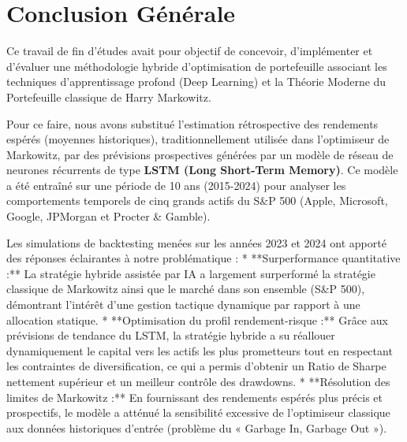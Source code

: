 \chapter*{Conclusion Générale}

Ce travail de fin d'études avait pour objectif de concevoir, d'implémenter et d'évaluer une méthodologie hybride d'optimisation de portefeuille associant les techniques d'apprentissage profond (Deep Learning) et la Théorie Moderne du Portefeuille classique de Harry Markowitz. 

Pour ce faire, nous avons substitué l'estimation rétrospective des rendements espérés (moyennes historiques), traditionnellement utilisée dans l'optimiseur de Markowitz, par des prévisions prospectives générées par un modèle de réseau de neurones récurrents de type \textbf{LSTM (Long Short-Term Memory)}. Ce modèle a été entraîné sur une période de 10 ans (2015-2024) pour analyser les comportements temporels de cinq grands actifs du S\&P 500 (Apple, Microsoft, Google, JPMorgan et Procter \& Gamble).

Les simulations de backtesting menées sur les années 2023 et 2024 ont apporté des réponses éclairantes à notre problématique :
* **Surperformance quantitative :** La stratégie hybride assistée par IA a largement surperformé la stratégie classique de Markowitz ainsi que le marché dans son ensemble (S\&P 500), démontrant l'intérêt d'une gestion tactique dynamique par rapport à une allocation statique.
* **Optimisation du profil rendement-risque :** Grâce aux prévisions de tendance du LSTM, la stratégie hybride a su réallouer dynamiquement le capital vers les actifs les plus prometteurs tout en respectant les contraintes de diversification, ce qui a permis d'obtenir un Ratio de Sharpe nettement supérieur et un meilleur contrôle des drawdowns.
* **Résolution des limites de Markowitz :** En fournissant des rendements espérés plus précis et prospectifs, le modèle a atténué la sensibilité excessive de l'optimiseur classique aux données historiques d'entrée (problème du « Garbage In, Garbage Out »).

